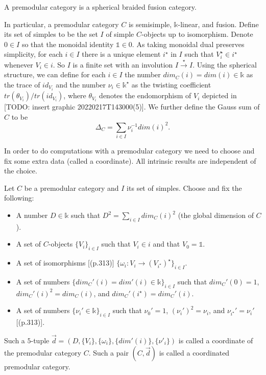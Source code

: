 \begin{definition}\label{def/premodular-category}
  A premodular category is a spherical braided fusion category.
\end{definition}

\noindent In particular, a premodular category $C$ is semisimple,
$\mathbb{k}$-linear, and fusion. Define its set of simples to be
the set $I$ of simple $C$-objects up to isomorphism. Denote
$0 \in I$ so that the monoidal identity $\mathbb{1} \in 0$. As
taking monoidal dual preserves simplicity, for each $i \in I$
there is a unique element $i^{\star}$ in $I$ such that
$V_{i}^{\star} \in i^{\star}$ whenever $V_{i} \in i$. So $I$ is a
finite set with an involution $I \xrightarrow{\star} I$. Using
the spherical structure, we can define for each $i \in I$ the
number $dim_{C}(i) = dim(i) \in \mathbb{k}$ as the trace of
$id_{V_{i}}$ and the number $\nu_{i} \in \mathbb{k}^{\star}$ as
the twisting coefficient $tr(\theta_{V_{i}})/tr(id_{V_{i}})$,
where $\theta_{V_{i}}$ denotes the endomorphism of $V_{i}$
depicted in [TODO: insert graphic 20220217T143000(5)]. We further
define the Gauss sum of $C$ to be
$$\Delta_{C} = \sum_{i \in I} \nu_{i}^{-1}dim(i)^{2}.$$

\noindent In order to do computations with a premodular category
we need to choose and fix some extra data (called a coordinate).
All intrinsic results are independent of the choice.

\begin{definition}\label{def/coordinated-premodular-category}
  Let $C$ be a premodular category and $I$ its set of simples.
  Choose and fix the following:
  \begin{itemize}
    \item A number $D \in \mathbb{k}$ such that
          $D^{2} = \sum_{i \in I} dim_{C}(i)^{2}$ (the global
          dimension of $C$).
    \item A set of $C$-objects $\{V_{i}\}_{i \in I}$ such
          that $V_{i} \in i$ and that $V_{0} = \mathbb{1}$.
    \item A set of isomorphisms [(p.313)]
          $\{\omega_{i}: V_{i} \to (V_{i^{\star}})^{\star}\}_{i \in I}$.
    \item A set of numbers
          $\{dim_{C}'(i) = dim'(i) \in \mathbb{k}\}_{i \in I}$
          such that $dim_{C}'(0) = 1$,
          $dim_{C}'(i)^{2} = dim_{C}(i)$, and
          $dim_{C}'(i^{\star}) = dim_{C}'(i)$.
    \item A set of numbers
          $\{\nu_{i}' \in \mathbb{k}\}_{i \in I}$ such that
          $\nu_{0}' = 1$, $(\nu_{i}')^{2} = \nu_{i}$, and
          $\nu_{i^{\star}}' = \nu_{i}'$ [(p.313)].
  \end{itemize}

  Such a $5$-tuple
  $\vec{d} = (D, \{V_{i}\}, \{\omega_{i}\}, \{dim'(i)\}, \{\nu'_{i}\})$
  is called a coordinate of the premodular category $C$. Such a
  pair $(C, \vec{d})$ is called a coordinated premodular
  category.
\end{definition}

